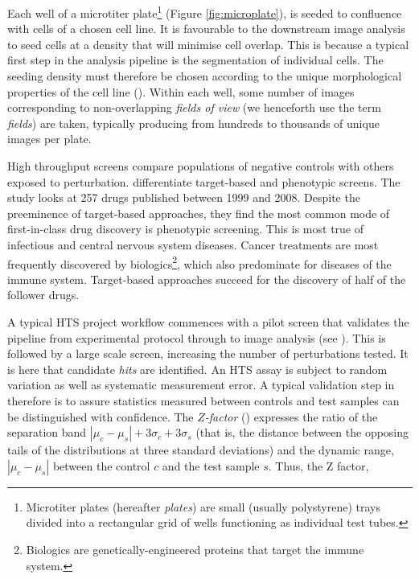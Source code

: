 Each well of a microtiter plate\footnote{Microtiter plates (hereafter \emph{plates}) are small (usually polystyrene) trays divided into a rectangular grid of wells functioning as individual test tubes.} (Figure \ref{fig:microplate}), is seeded to confluence with cells of a chosen cell line. It is favourable to the downstream image analysis to seed cells at a density that will minimise cell overlap. This is because a typical first step in the analysis pipeline is the segmentation of individual cells. The seeding density must therefore be chosen according to the unique morphological properties of the cell line (\cite{bray2016cell}). Within each well, some number of images corresponding to non-overlapping \emph{fields of view} (we henceforth use the term \emph{fields}) are taken, typically producing from hundreds to thousands of unique images per plate.

High throughput screens compare populations of negative controls with others exposed to perturbation. \cite{swinney2011were} differentiate target-based and phenotypic screens. The study looks at 257 drugs published between 1999 and 2008. Despite the preeminence of target-based approaches, they find the most common mode of first-in-class drug discovery is phenotypic screening. This is most true of infectious and central nervous system diseases. Cancer treatments are most frequently discovered by biologics\footnote{Biologics are genetically-engineered proteins that target the immune system.}, which also predominate for diseases of the immune system. Target-based approaches succeed for the discovery of half of the follower drugs. 

A typical HTS project workflow commences with a pilot screen that validates the pipeline from experimental protocol through to image analysis (see \cite{terjung2010high}). This is followed by a large scale screen, increasing the number of perturbations tested. It is here that candidate \emph{hits} are identified. An HTS assay is subject to random variation as well as systematic measurement error. A typical validation step in therefore is to assure statistics measured between controls and test samples can be distinguished with confidence. The \emph{$Z$-factor} (\cite{zhang1999simple}) expresses the ratio of the separation band $|\mu_c - \mu_s| + 3\sigma_c + 3\sigma_s$ (that is, the distance between the opposing tails of the distributions at three standard deviations) and the dynamic range, $|\mu_c - \mu_s|$ between the control $c$ and the test sample $s$. Thus, the Z factor,

